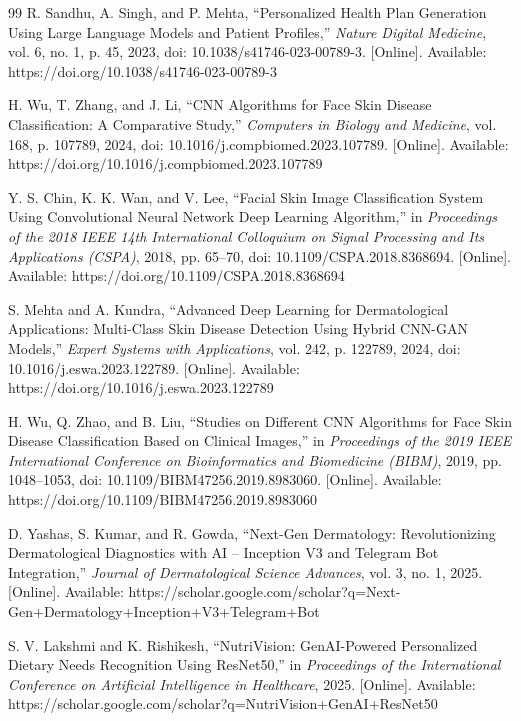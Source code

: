 \begin{thebibliography}{99}
R. Sandhu, A. Singh, and P. Mehta, ``Personalized Health Plan Generation Using Large Language Models and Patient Profiles,'' \textit{Nature Digital Medicine}, vol. 6, no. 1, p. 45, 2023, doi: 10.1038/s41746-023-00789-3. [Online]. Available: https://doi.org/10.1038/s41746-023-00789-3

H. Wu, T. Zhang, and J. Li, ``CNN Algorithms for Face Skin Disease Classification: A Comparative Study,'' \textit{Computers in Biology and Medicine}, vol. 168, p. 107789, 2024, doi: 10.1016/j.compbiomed.2023.107789. [Online]. Available: https://doi.org/10.1016/j.compbiomed.2023.107789

Y. S. Chin, K. K. Wan, and V. Lee, ``Facial Skin Image Classification System Using Convolutional Neural Network Deep Learning Algorithm,'' in \textit{Proceedings of the 2018 IEEE 14th International Colloquium on Signal Processing and Its Applications (CSPA)}, 2018, pp. 65--70, doi: 10.1109/CSPA.2018.8368694. [Online]. Available: https://doi.org/10.1109/CSPA.2018.8368694

S. Mehta and A. Kundra, ``Advanced Deep Learning for Dermatological Applications: Multi-Class Skin Disease Detection Using Hybrid CNN-GAN Models,'' \textit{Expert Systems with Applications}, vol. 242, p. 122789, 2024, doi: 10.1016/j.eswa.2023.122789. [Online]. Available: https://doi.org/10.1016/j.eswa.2023.122789

H. Wu, Q. Zhao, and B. Liu, ``Studies on Different CNN Algorithms for Face Skin Disease Classification Based on Clinical Images,'' in \textit{Proceedings of the 2019 IEEE International Conference on Bioinformatics and Biomedicine (BIBM)}, 2019, pp. 1048--1053, doi: 10.1109/BIBM47256.2019.8983060. [Online]. Available: https://doi.org/10.1109/BIBM47256.2019.8983060

D. Yashas, S. Kumar, and R. Gowda, ``Next-Gen Dermatology: Revolutionizing Dermatological Diagnostics with AI -- Inception V3 and Telegram Bot Integration,'' \textit{Journal of Dermatological Science Advances}, vol. 3, no. 1, 2025. [Online]. Available: https://scholar.google.com/scholar?q=Next-Gen+Dermatology+Inception+V3+Telegram+Bot

S. V. Lakshmi and K. Rishikesh, ``NutriVision: GenAI-Powered Personalized Dietary Needs Recognition Using ResNet50,'' in \textit{Proceedings of the International Conference on Artificial Intelligence in Healthcare}, 2025. [Online]. Available: https://scholar.google.com/scholar?q=NutriVision+GenAI+ResNet50


\end{thebibliography}
